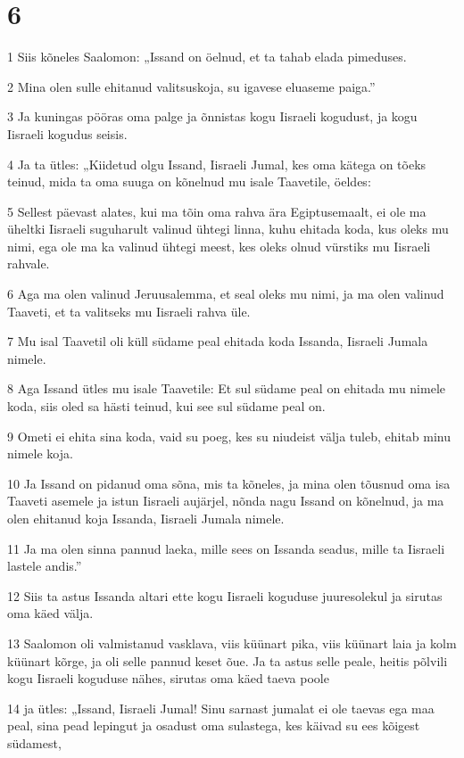 \chapter{6}

\par 1 Siis kõneles Saalomon: „Issand on öelnud, et ta tahab elada pimeduses.
\par 2 Mina olen sulle ehitanud valitsuskoja, su igavese eluaseme paiga.”
\par 3 Ja kuningas pööras oma palge ja õnnistas kogu Iisraeli kogudust, ja kogu Iisraeli kogudus seisis.
\par 4 Ja ta ütles: „Kiidetud olgu Issand, Iisraeli Jumal, kes oma kätega on tõeks teinud, mida ta oma suuga on kõnelnud mu isale Taavetile, öeldes:
\par 5 Sellest päevast alates, kui ma tõin oma rahva ära Egiptusemaalt, ei ole ma üheltki Iisraeli suguharult valinud ühtegi linna, kuhu ehitada koda, kus oleks mu nimi, ega ole ma ka valinud ühtegi meest, kes oleks olnud vürstiks mu Iisraeli rahvale.
\par 6 Aga ma olen valinud Jeruusalemma, et seal oleks mu nimi, ja ma olen valinud Taaveti, et ta valitseks mu Iisraeli rahva üle.
\par 7 Mu isal Taavetil oli küll südame peal ehitada koda Issanda, Iisraeli Jumala nimele.
\par 8 Aga Issand ütles mu isale Taavetile: Et sul südame peal on ehitada mu nimele koda, siis oled sa hästi teinud, kui see sul südame peal on.
\par 9 Ometi ei ehita sina koda, vaid su poeg, kes su niudeist välja tuleb, ehitab minu nimele koja.
\par 10 Ja Issand on pidanud oma sõna, mis ta kõneles, ja mina olen tõusnud oma isa Taaveti asemele ja istun Iisraeli aujärjel, nõnda nagu Issand on kõnelnud, ja ma olen ehitanud koja Issanda, Iisraeli Jumala nimele.
\par 11 Ja ma olen sinna pannud laeka, mille sees on Issanda seadus, mille ta Iisraeli lastele andis.”
\par 12 Siis ta astus Issanda altari ette kogu Iisraeli koguduse juuresolekul ja sirutas oma käed välja.
\par 13 Saalomon oli valmistanud vasklava, viis küünart pika, viis küünart laia ja kolm küünart kõrge, ja oli selle pannud keset õue. Ja ta astus selle peale, heitis põlvili kogu Iisraeli koguduse nähes, sirutas oma käed taeva poole
\par 14 ja ütles: „Issand, Iisraeli Jumal! Sinu sarnast jumalat ei ole taevas ega maa peal, sina pead lepingut ja osadust oma sulastega, kes käivad su ees kõigest südamest,
